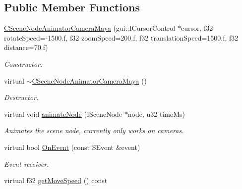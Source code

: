 \subsection*{Public Member Functions}
\begin{DoxyCompactItemize}
\item 
\hyperlink{classirr_1_1scene_1_1_c_scene_node_animator_camera_maya_ab4ff971f6c724c956c009e7e0c18a0f3}{C\-Scene\-Node\-Animator\-Camera\-Maya} (gui\-::\-I\-Cursor\-Control $\ast$cursor, f32 rotate\-Speed=-\/1500.f, f32 zoom\-Speed=200.f, f32 translation\-Speed=1500.f, f32 distance=70.f)
\begin{DoxyCompactList}\small\item\em Constructor. \end{DoxyCompactList}\item 
virtual \hyperlink{classirr_1_1scene_1_1_c_scene_node_animator_camera_maya_ae9716a265a6e235267ae2119b63eaaa6}{$\sim$\-C\-Scene\-Node\-Animator\-Camera\-Maya} ()
\begin{DoxyCompactList}\small\item\em Destructor. \end{DoxyCompactList}\item 
virtual void \hyperlink{classirr_1_1scene_1_1_c_scene_node_animator_camera_maya_a55478b94e6ab37debff513e680e96c27}{animate\-Node} (I\-Scene\-Node $\ast$node, u32 time\-Ms)
\begin{DoxyCompactList}\small\item\em Animates the scene node, currently only works on cameras. \end{DoxyCompactList}\item 
virtual bool \hyperlink{classirr_1_1scene_1_1_c_scene_node_animator_camera_maya_ae0e899fab90d69fdd02344ba419dcda9}{On\-Event} (const S\-Event \&event)
\begin{DoxyCompactList}\small\item\em Event receiver. \end{DoxyCompactList}\item 
\hypertarget{classirr_1_1scene_1_1_c_scene_node_animator_camera_maya_a6911e326c8097469a4f6744261875c2a}{virtual f32 \hyperlink{classirr_1_1scene_1_1_c_scene_node_animator_camera_maya_a6911e326c8097469a4f6744261875c2a}{get\-Move\-Speed} () const }\label{classirr_1_1scene_1_1_c_scene_node_animator_camera_maya_a6911e326c8097469a4f6744261875c2a}


\end{DoxyCompactItemize}
